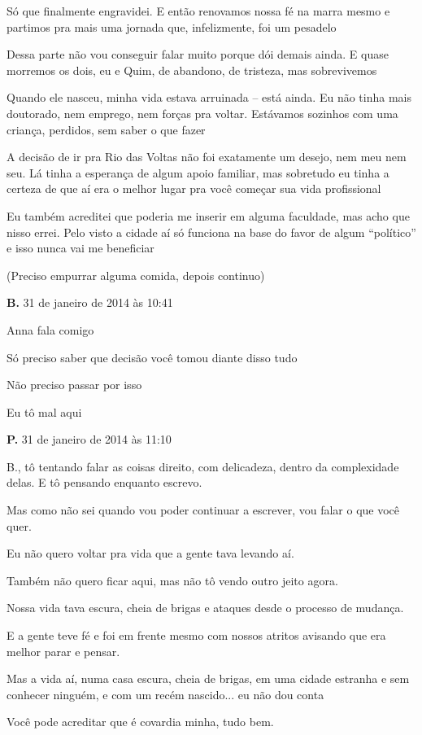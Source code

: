 {Só que finalmente engravidei. E então renovamos nossa fé na marra mesmo
e partimos pra mais uma jornada que, infelizmente, foi um pesadelo

Dessa parte não vou conseguir falar muito porque dói demais ainda. E
quase morremos os dois, eu e Quim, de abandono, de tristeza, mas
sobrevivemos

Quando ele nasceu, minha vida estava arruinada -- está ainda. Eu não
tinha mais doutorado, nem emprego, nem forças pra voltar. Estávamos
sozinhos com uma criança, perdidos, sem saber o que fazer

A decisão de ir pra Rio das Voltas não foi exatamente um desejo, nem meu
nem seu. Lá tinha a esperança de algum apoio familiar, mas sobretudo eu
tinha a certeza de que aí era o melhor lugar pra você começar sua vida
profissional

Eu também acreditei que poderia me inserir em alguma faculdade, mas acho
que nisso errei. Pelo visto a cidade aí só funciona na base do favor de
algum ``político'' e isso nunca vai me beneficiar

(Preciso empurrar alguma comida, depois continuo)

\textbf{B.} 31 de janeiro de 2014 às 10:41

Anna fala comigo

Só preciso saber que decisão você tomou diante disso tudo

Não preciso passar por isso

Eu tô mal aqui

\textbf{P.} 31 de janeiro de 2014 às 11:10

B., tô tentando falar as coisas direito, com delicadeza, dentro da
complexidade delas. E tô pensando enquanto escrevo.

Mas como não sei quando vou poder continuar a escrever, vou falar o que
você quer.

Eu não quero voltar pra vida que a gente tava levando aí.

Também não quero ficar aqui, mas não tô vendo outro jeito agora.

Nossa vida tava escura, cheia de brigas e ataques desde o processo de
mudança.

E a gente teve fé e foi em frente mesmo com nossos atritos avisando que
era melhor parar e pensar.

Mas a vida aí, numa casa escura, cheia de brigas, em uma cidade estranha
e sem conhecer ninguém, e com um recém nascido... eu não dou conta

Você pode acreditar que é covardia minha, tudo bem.

}
